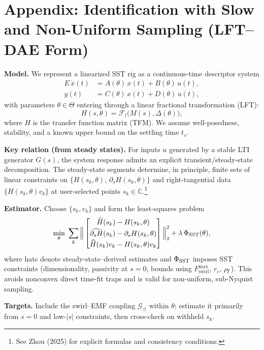 \documentclass[10pt,reprint,aps,onecolumn,nofootinbib]{revtex4-2}
\newcommand{\rc}{r_c}                                    %
\begin{document}
\section{Appendix: Identification with Slow and Non-Uniform Sampling (LFT--DAE Form)}
\label{sec:SST-LFT-ID}
    \textbf{Model.} We represent a linearized SST rig as a continuous-time descriptor system
    \begin{align}
    E\,\dot{x}(t) &= A(\theta)\,x(t)+B(\theta)\,u(t),\\
    y(t) &= C(\theta)\,x(t)+D(\theta)\,u(t),
    \end{align}
    with parameters $\theta\in\Theta$ entering through a linear fractional transformation (LFT):
    \[
    H(s,\theta)=\mathcal{F}_l\!\big(M(s),\Delta(\theta)\big),
    \]
    where $H$ is the transfer function matrix (TFM). We assume well-posedness, stability, and a known upper bound on the settling time $t_s$.

    \textbf{Key relation (from steady states).} For inputs $u$ generated by a stable LTI generator $G(s)$, the system response admits an explicit transient/steady-state decomposition. The steady-state segments determine, in principle, finite sets of linear constraints on $\{H(s_k,\theta),\, \partial_s H(s_k,\theta)\}$ and right-tangential data $\{H(s_k,\theta)v_k\}$ at user-selected points $s_k\in\mathbb{C}$.\footnote{See Zhou (2025) for explicit formulas and consistency conditions.}

    \textbf{Estimator.} Choose $\{s_k,v_k\}$ and form the least-squares problem
    \[
    \min_{\theta}\ \sum_k
    \Big\|
    \begin{bmatrix}
    \widehat{H}(s_k)-H(s_k,\theta)\\[2pt]
    \widehat{\partial_s H}(s_k)-\partial_s H(s_k,\theta)\\[2pt]
    \widehat{H}(s_k)v_k-H(s_k,\theta)v_k
    \end{bmatrix}
    \Big\|_2^2
    +\lambda\,\Phi_{\rm SST}(\theta),
    \]
    where hats denote steady-state–derived estimates and $\Phi_{\rm SST}$ imposes SST constraints (dimensionality, passivity at $s=0$, bounds using $F_{\text{swirl}}^{\max}$, $\rc$, $\rho_{\!f}$).
    This avoids nonconvex direct time-fit traps and is valid for non-uniform, sub-Nyquist sampling.

    \textbf{Targets.} Include the swirl–EMF coupling $\mathcal{G}_{\!\boldsymbol{\circlearrowleft}}$ within $\theta$; estimate it primarily from $s=0$ and low-$\lvert s\rvert$ constraints, then cross-check on withheld $s_k$.
\end{document}
